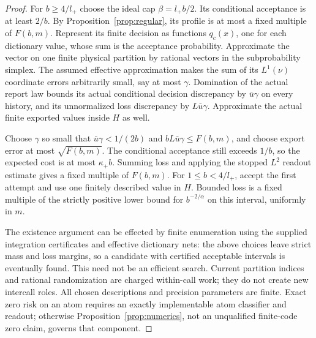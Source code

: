 \begin{proof}
For $b\ge4/l_+$ choose the ideal cap $\beta=l_+b/2$. Its conditional acceptance is at least $2/b$. By Proposition~\ref{prop:regular}, its profile is at most a fixed multiple of $F(b,m)$. Represent its finite decision as functions $q_c(x)$, one for each dictionary value, whose sum is the acceptance probability. Approximate the vector on one finite physical partition by rational vectors in the subprobability simplex. The assumed effective approximation makes the sum of its $L^1(\nu)$ coordinate errors arbitrarily small, say at most $\gamma$. Domination of the actual report law bounds its actual conditional decision discrepancy by $\bar u\gamma$ on every history, and its unnormalized loss discrepancy by $L\bar u\gamma$. Approximate the actual finite exported values inside $H$ as well.

Choose $\gamma$ so small that $\bar u\gamma<1/(2b)$ and $bL\bar u\gamma\le F(b,m)$, and choose export error at most $\sqrt{F(b,m)}$. The conditional acceptance still exceeds $1/b$, so the expected cost is at most $\kappa_+b$. Summing loss and applying the stopped $L^2$ readout estimate gives a fixed multiple of $F(b,m)$. For $1\le b<4/l_+$, accept the first attempt and use one finitely described value in $H$. Bounded loss is a fixed multiple of the strictly positive lower bound for $b^{-2/\alpha}$ on this interval, uniformly in $m$.

The existence argument can be effected by finite enumeration using the supplied integration certificates and effective dictionary nets: the above choices leave strict mass and loss margins, so a candidate with certified acceptable intervals is eventually found. This need not be an efficient search. Current partition indices and rational randomization are charged within-call work; they do not create new intercall roles. All chosen descriptions and precision parameters are finite. Exact zero risk on an atom requires an exactly implementable atom classifier and readout; otherwise Proposition~\ref{prop:numerics}, not an unqualified finite-code zero claim, governs that component.
\end{proof}

